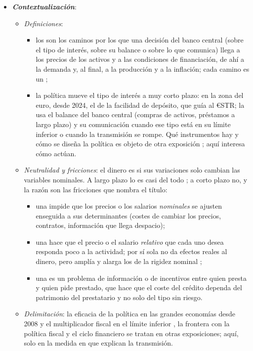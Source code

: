 \documentclass[11pt]{article}
\begin{document}
\begin{itemize}
\item \textbf{\emph{Contextualización}}:
  \begin{itemize}
  \item \emph{Definiciones}:
    \begin{itemize}
    \item los  son los caminos por los que una decisión del banco central (sobre el tipo de interés, sobre su balance o sobre lo que comunica) llega a los precios de los activos y a las condiciones de financiación, de ahí a la demanda y, al final, a la producción y a la inflación; cada camino es un ;
    \item la política  mueve el tipo de interés a muy corto plazo: en la zona del euro, desde 2024, el de la facilidad de depósito, que guía al €STR\nocite{BCE2024Marco}; la  usa el balance del banco central (compras de activos, préstamos a largo plazo) y su comunicación cuando ese tipo está en su límite inferior o cuando la transmisión se rompe. Qué instrumentos hay y cómo se diseña la política es objeto de otra exposición ; aquí interesa cómo actúan.
    \end{itemize}
  \item \emph{Neutralidad y fricciones}: el dinero es  si sus variaciones solo cambian las variables nominales. A largo plazo lo es casi del todo ; a corto plazo no, y la razón son las fricciones que nombra el título:
    \begin{itemize}
    \item una  impide que los precios o los salarios \emph{nominales} se ajusten enseguida a sus determinantes (costes de cambiar los precios, contratos, información que llega despacio);
    \item una  hace que el precio o el salario \emph{relativo} que cada uno desea responda poco a la actividad; por sí sola no da efectos reales al dinero, pero amplía y alarga los de la rigidez nominal\nocite{BallRomer1990Real} ;
    \item una  es un problema de información o de incentivos entre quien presta y quien pide prestado, que hace que el coste del crédito dependa del patrimonio del prestatario y no solo del tipo sin riesgo.
    \end{itemize}
  \item \emph{Delimitación}: la eficacia de la política en las grandes economías desde 2008 y el multiplicador fiscal en el límite inferior , la frontera con la política fiscal  y el ciclo financiero  se tratan en otras exposiciones; aquí, solo en la medida en que explican la transmisión.
  \end{itemize}


\end{itemize}
\end{document}
